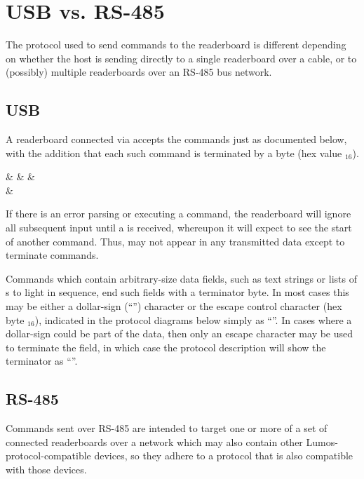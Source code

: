 \section{USB vs. RS-485}
The protocol used to send commands to the readerboard is different depending on
whether the host is sending directly to a single readerboard over a 
cable, or to (possibly) multiple readerboards over an RS-485 bus network.

\subsection{USB}
A readerboard connected via  accepts the commands just as documented
below, with the addition that each such command is terminated by a 
 byte (hex value $_{16}$).
\begin{center}
\begin{bytefield}[endianness=little,bitwidth=0.11111\textwidth]{9}
	&
	&
	&
	\\
	&
\end{bytefield}
\end{center}

If there is an error parsing or executing a command, the readerboard will ignore
all subsequent input until a  is received, whereupon it will
expect to see the start of another command. Thus,  may not
appear in any transmitted data except to terminate commands.

Commands which contain arbitrary-size data fields, such as text strings or lists of
\led s to light in sequence, end such fields with a terminator byte. In most cases
this may be
either a dollar-sign (``\z{\$}'') character or the
escape control character (hex byte $_{16}$), indicated in the protocol diagrams below
simply as ``\z{\$}''. In cases where a dollar-sign could be part of the data, then
only an escape character may be used to terminate the field, in which case the protocol
description will show the terminator as ``''.
\subsection{RS-485}
Commands sent over RS-485 are intended to target one or more of a set of
connected readerboards over a network which may also contain other Lumos-protocol-compatible
devices, so they adhere to a protocol that is also compatible with those devices.


